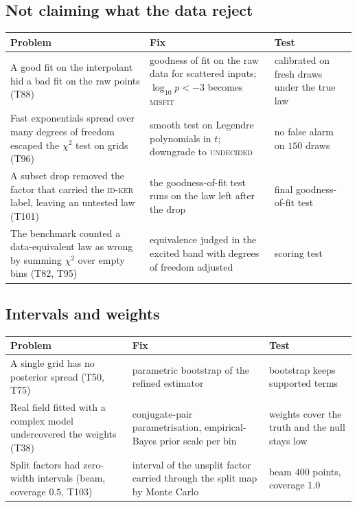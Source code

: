 \subsection{Not claiming what the data reject}
\begin{center}\small
\begin{tabular}{@{}L{4.1cm}L{4.4cm}L{4.4cm}@{}}
\toprule
Problem & Fix & Test\\\midrule
A good fit on the interpolant hid a bad fit on the raw points (T88) & goodness of fit on the raw data for scattered inputs; $\log_{10}p<-3$ becomes \textsc{misfit} & calibrated on fresh draws under the true law\\
Fast exponentials spread over many degrees of freedom escaped the $\chi^2$ test on grids (T96) & smooth test on Legendre polynomials in $t$; downgrade to \textsc{undecided} & no false alarm on $150$ draws\\
A subset drop removed the factor that carried the \textsc{id-ker} label, leaving an untested law (T101) & the goodness-of-fit test runs on the law left after the drop & final goodness-of-fit test\\
The benchmark counted a data-equivalent law as wrong by summing $\chi^2$ over empty bins (T82, T95) & equivalence judged in the excited band with degrees of freedom adjusted & scoring test\\
\bottomrule
\end{tabular}
\end{center}

\subsection{Intervals and weights}
\begin{center}\small
\begin{tabular}{@{}L{4.1cm}L{4.4cm}L{4.4cm}@{}}
\toprule
Problem & Fix & Test\\\midrule
A single grid has no posterior spread (T50, T75) & parametric bootstrap of the refined estimator & bootstrap keeps supported terms\\
Real field fitted with a complex model undercovered the weights (T38) & conjugate-pair parametrisation, empirical-Bayes prior scale per bin & weights cover the truth and the null stays low\\
Split factors had zero-width intervals (beam, coverage $0.5$, T103) & interval of the unsplit factor carried through the split map by Monte Carlo & beam $400$ points, coverage $1.0$\\
\bottomrule
\end{tabular}
\end{center}

